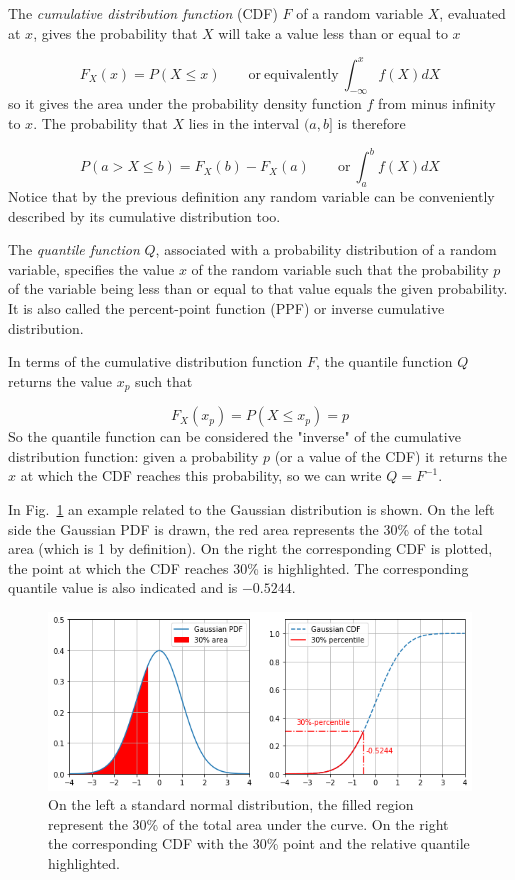 The \emph{cumulative distribution function} (CDF) $F$ of a random variable $X$, evaluated at $x$, gives the probability that $X$ will take a value less than or equal to $x$

\begin{equation}
F_X(x) = P(X \le x)\qquad\mathrm{or~equivalently}~\int_{-\infty}^{x}{f(X)dX}
\end{equation}
so it gives the area under the probability density function $f$ from minus infinity to $x$.
The probability that $X$ lies in the interval $(a,b]$ is therefore

\begin{equation}
P(a> X \le b)=F_{X}(b)-F_{X}(a)\qquad\mathrm{or}~\int_a^b{f(X)dX}
\end{equation}
Notice that by the previous definition any random variable can be conveniently described by its cumulative distribution too.

The \emph{quantile function} $Q$, associated with a probability distribution of a random variable, specifies the value $x$ of the random variable such that the probability $p$ of the variable being less than or equal to that value equals the given probability. It is also called the percent-point function (PPF) or inverse cumulative distribution.

In terms of the cumulative distribution function $F$, the quantile function $Q$ returns the value $x_p$ such that 

\begin{equation}
F_{X}(x_p)=P(X\le x_p)=p
\end{equation}
So the quantile function can be considered the "inverse" of the cumulative distribution function: given a probability $p$ (or a value of the CDF) it returns the $x$ at which the CDF reaches this probability, so we can write $Q=F^{-1}$.

In Fig.~\ref{fig:percentile} an example related to the Gaussian distribution is shown. On the left side the Gaussian PDF is drawn, the red area represents the 30\% of the total area (which is 1 by definition). On the right the corresponding CDF is plotted, the point at which the CDF reaches 30\% is highlighted. The corresponding quantile value is also indicated and is $-0.5244$.

\begin{figure}[htb]
	\centering
	\includegraphics[width=1.\textwidth]{figures/percentile.png}
	\caption{On the left a standard normal distribution, the filled region represent the 30\% of the total area under the curve. On the right the corresponding CDF with the 30\% point and the relative quantile highlighted.}
	\label{fig:percentile}
\end{figure}

